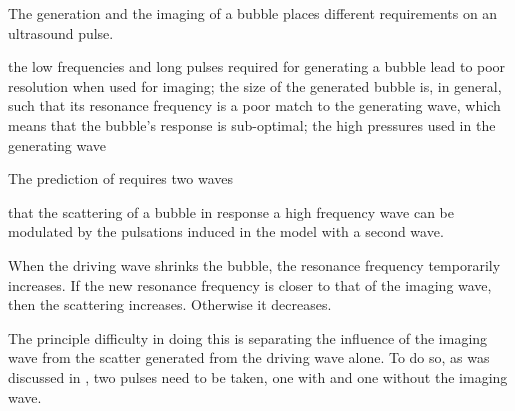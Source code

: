 








The generation and the imaging of a bubble places different requirements on an ultrasound pulse.

the low frequencies and long pulses required for generating a bubble lead to poor resolution 
when used for imaging;
the size of the generated bubble is, in general,
such that its resonance frequency is a poor match to the generating wave,
which means that the bubble's response is sub-optimal;
the high pressures used in the generating wave 


The prediction of  requires two waves

that the scattering of a bubble in response a high frequency wave
can be modulated by the pulsations induced in the model with a second wave.

When the driving wave shrinks the bubble, the resonance frequency temporarily increases.
If the new resonance frequency is closer to that of the imaging wave, then the scattering increases.
Otherwise it decreases.


The principle difficulty in doing this is separating the influence of the imaging wave from 
the scatter generated from the driving wave alone.
To do so, as was discussed in ,
two pulses need to be taken, one with and one without the imaging wave.


